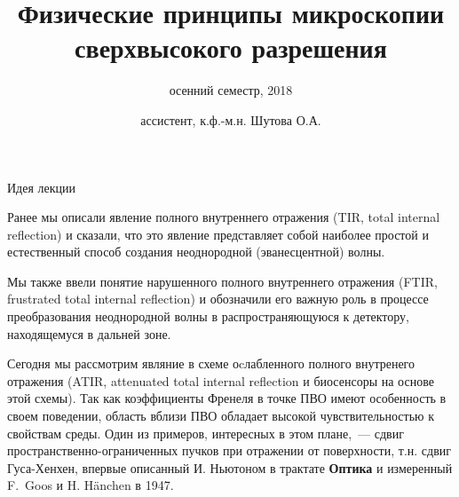 \documentclass[9pt, compress, xcolor=table]{beamer}
\title{Физические принципы микроскопии сверхвысокого разрешения}
\subtitle{осенний семестр, 2018}
\author{ассистент, к.ф.-м.н. Шутова О.А.}
\institute{МГУ им. М.В. Ломоносова, физический факультет}
\begin{document}
\maketitle


\begin{frame}{Идея лекции}

Ранее мы описали явление полного внутреннего отражения (\textcolor{red!50!black}{TIR, total internal reflection}) и сказали, что это явление представляет собой наиболее простой и естественный способ создания неоднородной (эванесцентной) волны. 

Мы также ввели понятие нарушенного полного внутреннего отражения (\textcolor{red!50!black}{FTIR, frustrated total internal reflection}) и обозначили его важную роль в процессе преобразования неоднородной волны в распространяющуюся к детектору, находящемуся в дальней зоне.

Сегодня мы рассмотрим являние в схеме оcлабленного полного внутренего отражения (\textcolor{red!50!black}{ATIR, attenuated total internal reflection} и биосенсоры на основе этой схемы). Так как коэффициенты Френеля в точке ПВО имеют особенность в своем поведении, область вблизи ПВО обладает высокой чувствительностью к свойствам среды. Один из примеров, интересных в этом плане,~--- сдвиг пространственно-ограниченных пучков при отражении от поверхности, т.н. \textcolor{red!50!black}{сдвиг Гуса-Хенхен}, впервые описанный И. Ньютоном в трактате \textbf{Оптика} и измеренный F.~Goos и H. H\"{a}nchen в 1947.

\end{frame}
\end{document}
